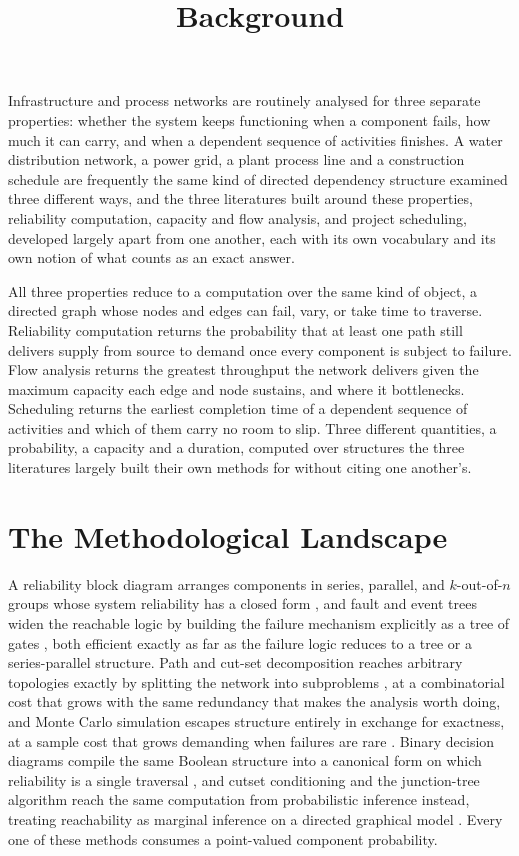 \documentclass[12pt]{report}
\begin{document}
\title{Background}
\fi

Infrastructure and process networks are routinely analysed for three separate properties:
whether the system keeps functioning when a component fails, how much it can carry, and when a
dependent sequence of activities finishes. A water distribution network, a power grid, a plant
process line and a construction schedule are frequently the same kind of directed dependency
structure examined three different ways, and the three literatures built around these
properties, reliability computation, capacity and flow analysis, and project scheduling,
developed largely apart from one another, each with its own vocabulary and its own notion of
what counts as an exact answer.

All three properties reduce to a computation over the same kind of object, a directed graph
whose nodes and edges can fail, vary, or take time to traverse. Reliability computation returns
the probability that at least one path still delivers supply from source to demand once every
component is subject to failure. Flow analysis returns the greatest throughput the network
delivers given the maximum capacity each edge and node sustains, and where it bottlenecks.
Scheduling returns the earliest completion time of a dependent sequence of activities and which
of them carry no room to slip. Three different quantities, a probability, a capacity and a
duration, computed over structures the three literatures largely built their own methods for
without citing one another's.

\section{The Methodological Landscape}
\label{sec:bg-landscape}

A reliability block diagram arranges components in series, parallel, and $k$-out-of-$n$ groups
whose system reliability has a closed form \cite{billinton1992network}, and fault and event trees
widen the reachable logic by building the failure mechanism explicitly as a tree of gates
\cite{xing2008fault}, both efficient exactly as far as the failure logic reduces to a tree or a
series-parallel structure. Path and cut-set decomposition reaches arbitrary topologies exactly by
splitting the network into subproblems \cite{liu2012improved,kim2013network}, at a combinatorial
cost that grows with the same redundancy that makes the analysis worth doing, and Monte Carlo
simulation escapes structure entirely in exchange for exactness, at a sample cost that grows
demanding when failures are rare \cite{fishman1986comparison}. Binary decision diagrams compile
the same Boolean structure into a canonical form on which reliability is a single traversal
\cite{bryant1986graph,rauzy1993new}, and cutset conditioning and the junction-tree algorithm reach
the same computation from probabilistic inference instead, treating reachability as marginal
inference on a directed graphical model \cite{pearl1988probabilistic,lauritzen1988local}. Every
one of these methods consumes a point-valued component probability.
\end{document}
